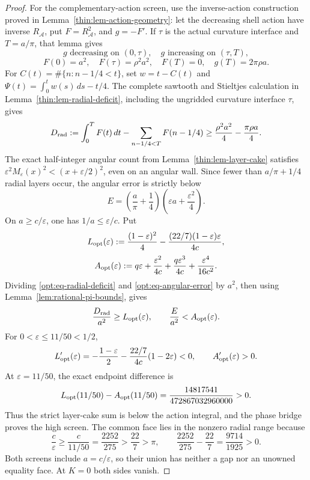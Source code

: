 \documentclass[11pt]{article}
\numberwithin{equation}{section}
\theoremstyle{definition}
\theoremstyle{remark}
\begin{document}
\begin{proof}
For the complementary-action screen, use the inverse-action construction
proved in Lemma~\ref{thin:lem-action-geometry}: let the decreasing shell
action have inverse \(R_{\mathcal A}\), put \(F=R_{\mathcal A}^2\), and
\(g=-F'\).  If \(\tau\) is the actual curvature interface and
\(T=a/\pi\), that lemma gives
\[
 g\text{ decreasing on }(0,\tau),\quad
 g\text{ increasing on }(\tau,T),
\]
\[
 F(0)=a^2,\quad F(\tau)=\rho^2a^2,\quad F(T)=0,\quad
 g(T)=2\pi\rho a.
\]
For \(C(t)=\#\{n:n-1/4<t\}\), set \(w=t-C(t)\) and
\(\Psi(t)=\int_0^tw(s)\,ds-t/4\).  The complete sawtooth and Stieltjes
calculation in Lemma~\ref{thin:lem-radial-deficit}, including the ungridded
curvature interface \(\tau\), gives
\begin{equation}
 D_{\rm rad}:=\int_0^TF(t)\,dt
 -\sum_{n-1/4<T}F(n-1/4)
 \geq\frac{\rho^2a^2}{4}-\frac{\pi\rho a}{4}.
 \label{opt:eq-radial-deficit}
\end{equation}
The exact half-integer angular count from
Lemma~\ref{thin:lem-layer-cake} satisfies
\(\varepsilon^2M_\varepsilon(x)^2<(x+\varepsilon/2)^2\), even on an
angular wall.  Since fewer than \(a/\pi+1/4\) radial layers occur, the
angular error is strictly below
\begin{equation}
 E=\left(\frac a\pi+\frac14\right)
 \left(\varepsilon a+\frac{\varepsilon^2}{4}\right).
 \label{opt:eq-angular-error}
\end{equation}
On \(a\geq c/\varepsilon\), one has \(1/a\leq\varepsilon/c\).  Put
\[
 L_{\rm opt}(\varepsilon)
 :=\frac{(1-\varepsilon)^2}{4}
 -\frac{(22/7)(1-\varepsilon)\varepsilon}{4c},
\]
\[
 A_{\rm opt}(\varepsilon)
 :=q\varepsilon+\frac{\varepsilon^2}{4c}
 +\frac{q\varepsilon^3}{4c}
 +\frac{\varepsilon^4}{16c^2}.
\]
Dividing \eqref{opt:eq-radial-deficit} and
\eqref{opt:eq-angular-error} by \(a^2\), then using
Lemma~\ref{lem:rational-pi-bounds}, gives
\[
 \frac{D_{\rm rad}}{a^2}\geq L_{\rm opt}(\varepsilon),
 \qquad
 \frac{E}{a^2}<A_{\rm opt}(\varepsilon).
\]
For \(0<\varepsilon\leq11/50<1/2\),
\[
 L_{\rm opt}'(\varepsilon)
 =-\frac{1-\varepsilon}{2}
 -\frac{22/7}{4c}(1-2\varepsilon)<0,
 \qquad
 A_{\rm opt}'(\varepsilon)>0.
\]
At \(\varepsilon=11/50\), the exact endpoint difference is
\begin{equation}
 L_{\rm opt}(11/50)-A_{\rm opt}(11/50)
 =\frac{14817541}{472867032960000}>0.
 \label{opt:eq-high-reserve}
\end{equation}
Thus the strict layer-cake sum is below the action integral, and the phase
bridge proves the high screen.  The common face lies in the nonzero radial
range because
\[
 \frac c\varepsilon\geq\frac{c}{11/50}
 =\frac{2252}{275}>\frac{22}{7}>\pi,
 \qquad
 \frac{2252}{275}-\frac{22}{7}=\frac{9714}{1925}>0.
\]
Both screens include \(a=c/\varepsilon\), so their union has neither a gap
nor an unowned equality face.  At \(K=0\) both sides vanish.
\end{proof}
\end{document}
